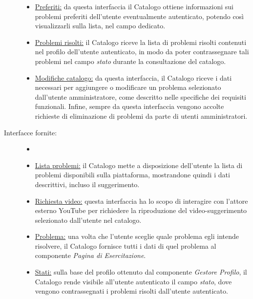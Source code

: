 \documentclass[11pt, a4paper]{article}
\theoremstyle{definition} %
\begin{document}
\begin{description}
\begin{itemize}
        \item \underline{Preferiti:} da questa interfaccia il Catalogo
        ottiene informazioni sui problemi preferiti dell'utente
        eventualmente autenticato, potendo così visualizzarli sulla
        lista, nel campo dedicato.

        \item \underline{Problemi risolti:} il Catalogo riceve la
        lista di problemi risolti contenuti nel profilo dell'utente
        autenticato, in modo da poter contrassegnare tali problemi
        nel campo \textit{stato} durante la consultazione del
        catalogo.

        \item \underline{Modifiche catalogo:} da questa interfaccia,
        il Catalogo riceve i dati necessari per aggiungere o modificare
        un problema selezionato dall'utente amministratore, come
        descritto nelle specifiche dei requisiti funzionali. Infine,
        sempre da questa interfaccia vengono accolte richieste di
        eliminazione di problemi da parte di utenti amministratori.
    \end{itemize}

    \item[Interfacce fornite:]
    \begin{itemize}
        \item[]

        \item \underline{Lista problemi:} il Catalogo mette a disposizione
        dell'utente la lista di problemi disponibili sulla piattaforma,
        mostrandone quindi i dati descrittivi, incluso il suggerimento.

        \item \underline{Richiesta video:} questa interfaccia ha lo scopo
        di interagire con l'attore esterno YouTube per richiedere la
        riproduzione del video-suggerimento selezionato dall'utente
        nel catalogo.

        \item \underline{Problema:} una volta che l'utente sceglie quale
        problema egli intende risolvere, il Catalogo fornisce tutti i
        dati di quel problema al componente \textit{Pagina di Esercitazione}.

        \item \underline{Stati:} sulla base del profilo ottenuto
        dal componente \textit{Gestore Profilo}, il Catalogo rende
        visibile all'utente autenticato il campo \textit{stato},
        dove vengono contrassegnati i problemi risolti dall'utente
        autenticato.


\end{itemize}
\end{description}
\end{document}
